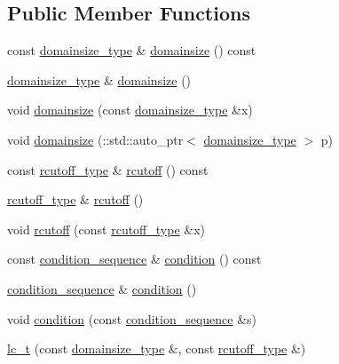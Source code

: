 \subsection*{Public Member Functions}
\begin{DoxyCompactItemize}
\item 
const \hyperlink{classlc__t_a14e4ab30758da00bc9f186b0ef06a97e}{domainsize\-\_\-type} \& \hyperlink{classlc__t_ae7d80b95cc85ddd6a3461fac75cc3e5d}{domainsize} () const 
\item 
\hyperlink{classlc__t_a14e4ab30758da00bc9f186b0ef06a97e}{domainsize\-\_\-type} \& \hyperlink{classlc__t_a22daf97db73443148a86d81fdf071b46}{domainsize} ()
\item 
void \hyperlink{classlc__t_acdf9b3388324ce06b225a065a44cc693}{domainsize} (const \hyperlink{classlc__t_a14e4ab30758da00bc9f186b0ef06a97e}{domainsize\-\_\-type} \&x)
\item 
void \hyperlink{classlc__t_a58cb201bccba999cf88cd42a27ddb528}{domainsize} (\-::std\-::auto\-\_\-ptr$<$ \hyperlink{classlc__t_a14e4ab30758da00bc9f186b0ef06a97e}{domainsize\-\_\-type} $>$ p)
\item 
const \hyperlink{classlc__t_aeee50e2ac6fe42996cb39a92ad78883e}{rcutoff\-\_\-type} \& \hyperlink{classlc__t_a59976922c45ca81470b9766c08fe891e}{rcutoff} () const 
\item 
\hyperlink{classlc__t_aeee50e2ac6fe42996cb39a92ad78883e}{rcutoff\-\_\-type} \& \hyperlink{classlc__t_a646434eaec4a3ffeeedd40928eda2dfd}{rcutoff} ()
\item 
void \hyperlink{classlc__t_a36e418944e3409c2cafb07f115cf317a}{rcutoff} (const \hyperlink{classlc__t_aeee50e2ac6fe42996cb39a92ad78883e}{rcutoff\-\_\-type} \&x)
\item 
const \hyperlink{classlc__t_a0ee6b40c23baf2237388873de0c9df3f}{condition\-\_\-sequence} \& \hyperlink{classlc__t_a3ebe73f89c78475fc19ec459b40ed193}{condition} () const 
\item 
\hyperlink{classlc__t_a0ee6b40c23baf2237388873de0c9df3f}{condition\-\_\-sequence} \& \hyperlink{classlc__t_a7c7290f4578db48bba9b678a48083a61}{condition} ()
\item 
void \hyperlink{classlc__t_a03178f2b8c91b04faedcd0abd7df5aff}{condition} (const \hyperlink{classlc__t_a0ee6b40c23baf2237388873de0c9df3f}{condition\-\_\-sequence} \&s)
\item 
\hyperlink{classlc__t_ac66336f0d6a44cbe9f896ac9fd441aec}{lc\-\_\-t} (const \hyperlink{classlc__t_a14e4ab30758da00bc9f186b0ef06a97e}{domainsize\-\_\-type} \&, const \hyperlink{classlc__t_aeee50e2ac6fe42996cb39a92ad78883e}{rcutoff\-\_\-type} \&)

\end{DoxyCompactItemize}
